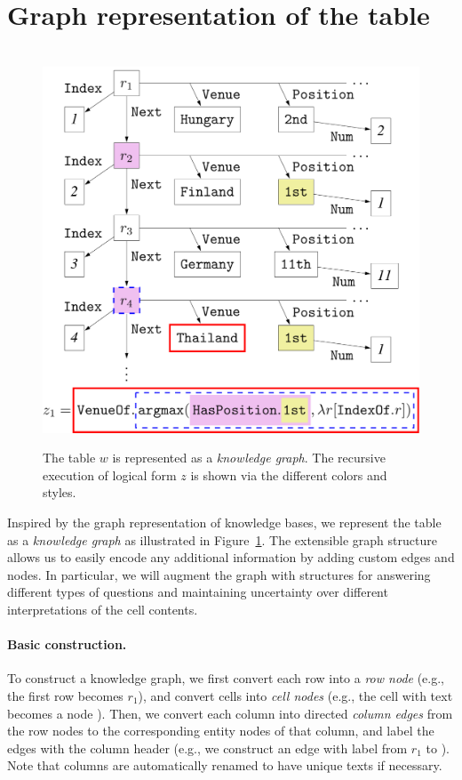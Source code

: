 
\section{Graph representation of the table}
\label{sec:sempre-graph}

\begin{figure}[tp]
\centering

\\[1em]
\includegraphics[scale=0.4]{sfig/dpd.slides/knowledgeGraph.pdf}
\caption[
Knowledge graph and execution of logical forms.
]{
The table $w$ is represented as a \emph{knowledge graph}.
The recursive execution of logical form $z$ is shown
via the different colors and styles.}
\label{fig:knowledge-graph}
\end{figure}

Inspired by the graph representation of knowledge bases,
we represent the table as a \emph{knowledge graph}
as illustrated in Figure~\ref{fig:knowledge-graph}.
The extensible graph structure
allows us to easily encode any additional information
by adding custom edges and nodes.
In particular, we will augment the graph with structures
for answering different types of questions
and maintaining uncertainty over different interpretations of the cell contents.

\paragraph{Basic construction.}
To construct a knowledge graph,
we first convert each row into a \emph{row node}
(e.g., the first row becomes $r_1$),
and convert cells into \emph{cell nodes}
(e.g., the cell with text 
becomes a node ).
Then, we convert each column into directed \emph{column edges}
from the row nodes to the corresponding entity nodes
of that column,
and label the edges with the column header
(e.g., we construct an edge with label 
from $r_1$ to ).
Note that columns are automatically renamed
to have unique texts if necessary.

